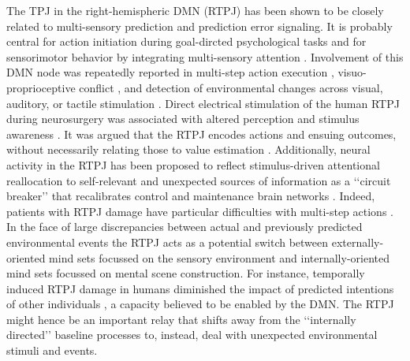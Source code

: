 \documentclass[10pt,letterpaper]{article}
\begin{document}
The TPJ in the right-hemispheric DMN (RTPJ)
has been shown to be closely related to
multi-sensory prediction and prediction error signaling.
It is probably central for
action initiation during goal-dircted psychological tasks and for
sensorimotor behavior by integrating multi-sensory attention
\citep{corbetta2002control}.
Involvement of this DMN node was repeatedly reported in
multi-step action execution \citep{hartmann2005takes},
visuo-proprioceptive conflict \citep{Balslev2005}, and
detection of environmental changes across
visual, auditory, or tactile stimulation
\citep{downar2000multimodal}.
Direct electrical stimulation of the human
RTPJ during neurosurgery was associated with altered perception
and stimulus awareness \citep{blanke2002neuropsychology}.
%
It was argued that the RTPJ encodes actions and ensuing outcomes,
without necessarily relating those to value estimation
\citep{liljeholm2013neural, hamilton2008action,
jakobs2009effects}.
Additionally, neural activity in the RTPJ has been proposed to reflect
stimulus-driven attentional reallocation to
self-relevant and unexpected sources of information
as a ‘‘circuit breaker’’ that recalibrates control and maintenance brain networks
\citep{bzdok2013tpj, corbettashul2008}.
Indeed, patients with RTPJ damage have particular difficulties
with multi-step actions \citep{hartmann2005takes}.
In the face of large discrepancies between actual and previously predicted
environmental events the RTPJ acts as a potential switch between
externally-oriented mind sets focussed on the
sensory environment and internally-oriented mind sets focussed
on mental scene construction.
For instance, temporally induced RTPJ damage in humans diminished the
impact of predicted intentions of other individuals
\citep{young2010disruption},
a capacity believed to be enabled by the DMN.
The RTPJ might hence be an important relay that shifts away
from the ‘‘internally directed’’ baseline processes
to, instead, deal with unexpected environmental stimuli and events.
\end{document}
